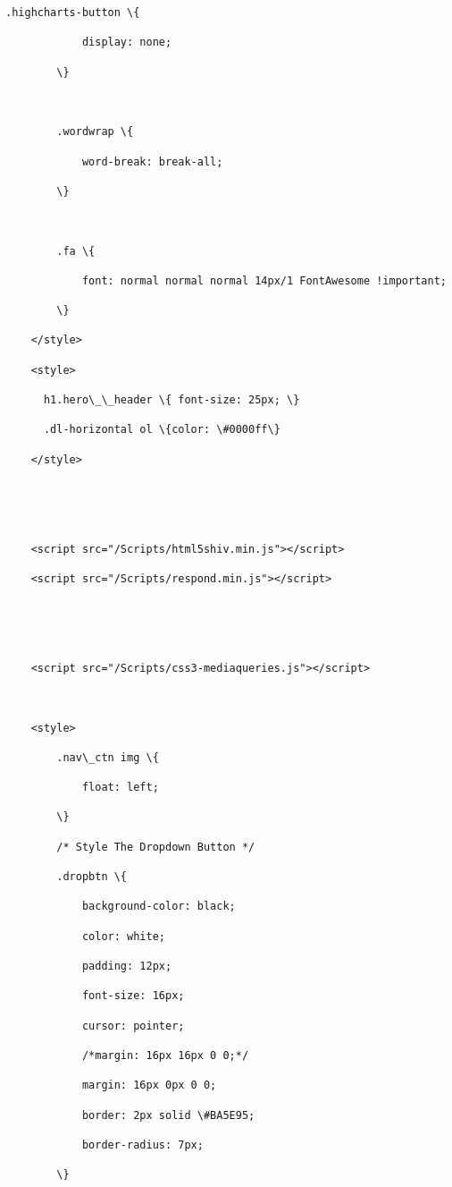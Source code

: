 \documentclass[11pt]{article}
\begin{document}
\begin{Verbatim}[commandchars=\\\{\}]
        .highcharts-button \{

            display: none;

        \}



        .wordwrap \{

            word-break: break-all;

        \}



        .fa \{

            font: normal normal normal 14px/1 FontAwesome !important;

        \}

    </style>

    <style>

      h1.hero\_\_header \{ font-size: 25px; \}

      .dl-horizontal ol \{color: \#0000ff\}

    </style>



    

    <script src="/Scripts/html5shiv.min.js"></script>

    <script src="/Scripts/respond.min.js"></script>



    

    <script src="/Scripts/css3-mediaqueries.js"></script>



    <style>

        .nav\_ctn img \{

            float: left;

        \}

        /* Style The Dropdown Button */

        .dropbtn \{

            background-color: black;

            color: white;

            padding: 12px;

            font-size: 16px;

            cursor: pointer;

            /*margin: 16px 16px 0 0;*/

            margin: 16px 0px 0 0;

            border: 2px solid \#BA5E95;

            border-radius: 7px;

        \}




\end{Verbatim}
\end{document}
